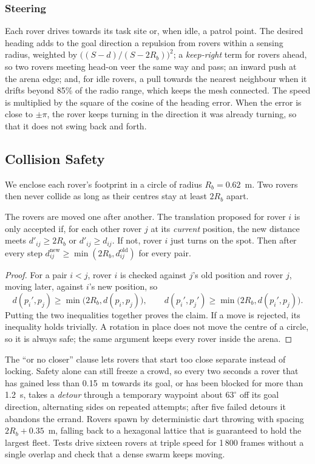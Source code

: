 \subsubsection{Steering} Each rover drives towards its task site or, when
idle, a patrol point. The desired heading adds to the goal direction a
repulsion from rovers within a sensing radius, weighted by
$\bigl((S-d)/(S-2R_b)\bigr)^2$; a \emph{keep-right} term for rovers ahead, so
two rovers meeting head-on veer the same way and pass; an inward push at the
arena edge; and, for idle rovers, a pull towards the nearest neighbour when it
drifts beyond 85\% of the radio range, which keeps the mesh connected. The
speed is multiplied by the square of the cosine of the heading error. When the
error is close to $\pm\pi$, the rover keeps turning in the direction it was
already turning, so that it does not swing back and forth.

\subsection{Collision Safety}

We enclose each rover's footprint in a circle of radius $R_b=0.62$~m. Two
rovers then never collide as long as their centres stay at least $2R_b$
apart.

\begin{proposition}
The rovers are moved one after another. The translation proposed for rover
$i$ is only accepted if, for each other rover $j$ at its \emph{current}
position, the new distance meets $d'_{ij}\ge2R_b$ or $d'_{ij}\ge d_{ij}$. If
not, rover $i$ just turns on the spot. Then after every step
$d_{ij}^{\text{new}}\ge\min(2R_b,d_{ij}^{\text{old}})$ for every pair.
\end{proposition}

\begin{proof}
For a pair $i<j$, rover $i$ is checked against $j$'s old position and rover
$j$, moving later, against $i$'s new position, so
\[
d(p_i',p_j)\ge\min\bigl(2R_b,d(p_i,p_j)\bigr),\qquad
d(p_i',p_j')\ge\min\bigl(2R_b,d(p_i',p_j)\bigr).
\]
Putting the two inequalities together proves the claim. If a move is
rejected, its inequality holds trivially. A rotation in place does not move the centre of a circle, so
it is always safe; the same argument keeps every rover inside the arena.
\end{proof}

The ``or no closer'' clause lets rovers that start too close separate instead
of locking. Safety alone can still freeze a crowd, so every two seconds a
rover that has gained less than 0.15~m towards its goal, or has been blocked
for more than 1.2~s, takes a \emph{detour} through a temporary waypoint about
$63^\circ$ off its goal direction, alternating sides on repeated attempts;
after five failed detours it abandons the errand. Rovers spawn by
deterministic dart throwing with spacing $2R_b+0.35$~m, falling back to a
hexagonal lattice that is guaranteed to hold the largest fleet. Tests drive
sixteen rovers at triple speed for 1\,800 frames without a single overlap and
check that a dense swarm keeps moving.

